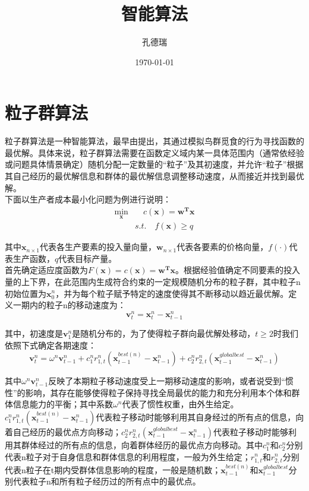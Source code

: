 \documentclass[11pt,a4paper]{article}
\title{智能算法}
\author{孔德瑞}
\date{\today}
\begin{document}
\maketitle

\newpage
\section{粒子群算法}

粒子群算法是一种智能算法，最早由\textcite{RN5870}提出，其通过模拟鸟群觅食的行为寻找函数的最优解。具体来说，粒子群算法需要在函数定义域内某一具体范围内（通常依经验或问题具体情景确定）随机分配一定数量的“粒子”及其初速度，并允许“粒子”根据其自己经历的最优解信息和群体的最优解信息调整移动速度，从而接近并找到最优解。\\

下面以生产者成本最小化问题为例进行说明：
\begin{equation}\label{eqcmp}
\begin{aligned}
	\min_{\mathbf{x}} &\quad c(\mathbf{x})=\mathbf{w^T x}\\
	&s.t. \quad f(\mathbf{x}) \geq q 
\end{aligned}
\end{equation}

其中$\mathbf{x}_{n\times1}$代表各生产要素的投入量向量，$\mathbf{w}_{n\times1}$代表各要素的价格向量，$f(·)$代表生产函数，$q$代表目标产量。\\

首先确定适应度函数为$F(\mathbf{x})=c(\mathbf{x})=\mathbf{w^T x}$。根据经验值确定不同要素的投入量的上下界，在此范围内生成符合约束的一定规模随机分布的粒子群，其中粒子n初始位置为$\mathbf{x}^n_0$，并为每个粒子赋予特定的速度使得其不断移动以趋近最优解。定义一期内的粒子n的移动速度为：
\begin{equation}\label{eqvdef}
    \mathbf{v}^n_{t}=\mathbf{x}^n_{t}-\mathbf{x}^n_{t-1}
\end{equation}

其中，初速度是$\mathbf{v}^n_{1}$是随机分布的，为了使得粒子群向最优解处移动，$t \geq 2$时我们依照下式确定各期速度：
\begin{equation}\label{eqvcal}
    \mathbf{v}^n_{t}=\omega^n\mathbf{v}^n_{t-1}+c^n_{1}r^n_{1,t}(\mathbf{x}^{best(n)}_{t-1}-\mathbf{x}^n_{t-1})+c^n_{2}r^n_{2,t}(\mathbf{x}^{globalbest}_{t-1}-\mathbf{x}^n_{t-1})
\end{equation}

其中$\omega^n\mathbf{v}^n_{t-1}$反映了本期粒子移动速度受上一期移动速度的影响，或者说受到“惯性”的影响，其存在能够使得粒子保持寻找全局最优的能力和充分利用本个体和群体信息能力的平衡；其中系数$\omega^n$代表了惯性权重，由外生给定。$c^n_{1}r^n_{1,t}(\mathbf{x}^{best(n)}_{t-1}-\mathbf{x}^n_{t-1})$代表粒子移动时能够利用其自身经过的所有点的信息，向着自己经历的最优点方向移动；$c^n_{2}r^n_{2,t}(\mathbf{x}^{globalbest}_{t-1}-\mathbf{x}^n_{t-1})$代表粒子移动时能够利用其群体经过的所有点的信息，向着群体经历的最优点方向移动。其中$c^n_{1}$和$c^n_{2}$分别代表n粒子对于自身信息和群体信息的利用程度，一般为外生给定；$r^n_{1,t}$和$r^n_{2,t}$分别代表n粒子在t期内受群体信息影响的程度，一般是随机数；$\mathbf{x}^{best(n)}_{t-1}$和$\mathbf{x}^{globalbest}_{t-1}$分别代表粒子n和所有粒子经历过的所有点中的最优点。\\
\end{document}
